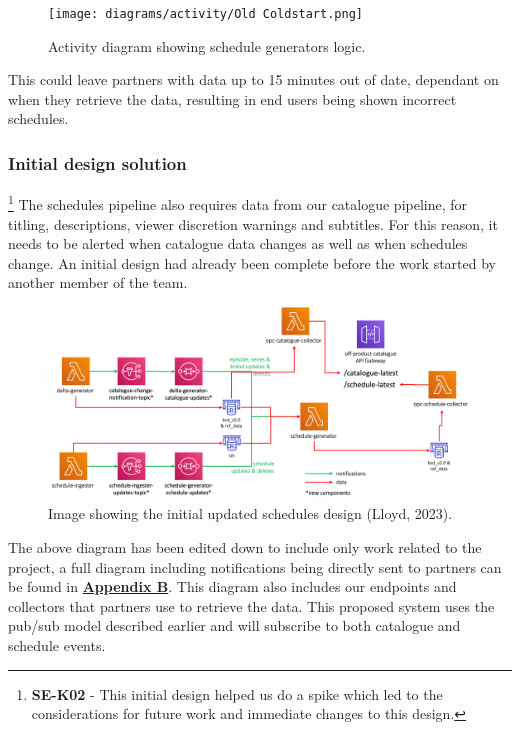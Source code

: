   \begin{figure}[H]
    \centering
    \texttt{[image: diagrams/activity/Old Coldstart.png]}
    \caption{Activity diagram showing schedule generators logic.}
    \label{fig:oldColdstart}
  \end{figure}

  This could leave partners with data up to 15 minutes out of date, dependant on when they retrieve the data, resulting in end users being shown incorrect
  schedules. 

    \subsubsection{Initial design solution}
    \footnote{\textbf{SE-K02} - This initial design helped us do a spike which led to the considerations for future work and immediate changes to this design.}
    The schedules pipeline also requires data from our catalogue pipeline, for titling, descriptions, viewer discretion warnings and subtitles. For this 
    reason, it needs to be alerted when catalogue data changes as well as when schedules change. An initial design had already been complete before the work 
    started by another member of the team.

    \begin{figure}[H]
      \centering
      \includegraphics[width=12cm]{assets/initialDesign/architecture.png}
      \caption{Image showing the initial updated schedules design (Lloyd, 2023).}
      \label{fig:initialDesign}
    \end{figure}

    The above diagram has been edited down to include only work related to the project, a full diagram including notifications being directly sent to partners can 
    be found in \hyperref[sec:AppendixB]{\textbf{Appendix B}}. This diagram also includes our endpoints and collectors that partners use to 
    retrieve the data. This proposed system uses the pub/sub model described earlier and will subscribe to both catalogue and schedule events.

